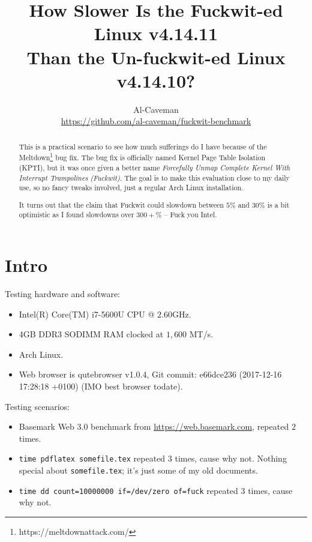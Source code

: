 \documentclass[12pt,a4paper,onecolumn, openright]{article}
\title{How Slower Is the Fuckwit-ed Linux v4.14.11\\
Than the Un-fuckwit-ed Linux v4.14.10?}
\author{Al-Caveman\\\url{https://github.com/al-caveman/fuckwit-benchmark}}
\begin{document}
\maketitle
\begin{abstract}
This is a practical scenario to see how much sufferings do I have because of
the Meltdown\footnote{https://meltdownattack.com/} bug fix. The bug fix is
officially named Kernel Page Table Isolation (KPTI), but it was once given a
better name \emph{Forcefully Unmap Complete Kernel With Interrupt Trampolines
(Fuckwit)}. The goal is to make this evaluation close to my daily use, so no
fancy tweaks involved, just a regular Arch Linux installation.

It turns out that the claim that Fuckwit could slowdown between
$5\%$ and $30\%$ is a bit optimistic as I found slowdowns over $300+\%$ -- Fuck
you Intel.
\end{abstract}

\section{Intro}
Testing hardware and software:
\begin{itemize}
    \item Intel(R) Core(TM) i7-5600U CPU @ $2.60$GHz.
    \item 4GB DDR3 SODIMM RAM clocked at $1,600$ MT/s.
    \item Arch Linux.
    \item Web browser is qutebrowser v1.0.4, Git commit: e66dce236 (2017-12-16
    17:28:18 +0100) (IMO best browser todate).
\end{itemize}
Testing scenarios:
\begin{itemize}
    \item Basemark Web 3.0 benchmark from \url{https://web.basemark.com},
    repeated $2$ times.
    \item \texttt{time pdflatex somefile.tex} repeated $3$ times, cause why
    not. Nothing special about \texttt{somefile.tex}; it's just some of my old
    documents.
    \item \texttt{time dd count=10000000 if=/dev/zero of=fuck} repeated $3$
    times, cause why not.
\end{itemize}
\end{document}
